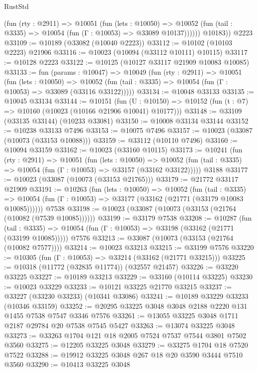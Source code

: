 \begin{lexlean}{RustStd}
\begin{coremodule}
            (fun (rty : @2911) =>
            @10051
              (fun (lets : @10050) =>
              @10052 (fun (tail : @3335) => @10054 (fun (Γ : @10053) => @33089 @10137))))))
        @10183))
    @2223
@33109 := @10189 (@33082 (@10040 @2223))
@33112 := @10102 (@10103 @2223) @21906
@33116 := @10023 (@10094 (@33112 @10111) @10115)
@33117 := @10128 @2223
@33122 := @10125 (@10127 @33117 @21909 @10083 @10085)
@33133 := fun (params : @10047) =>
  @10049
    (fun (rty : @2911) =>
    @10051
      (fun (lets : @10050) =>
      @10052 (fun (tail : @3335) => @10054 (fun (Γ : @10053) => @33089 (@33116 @33122)))))
@33134 := @10048 @33133
@33135 := @10045 @33134
@33144 := @10151
    (fun (U : @10150) => @10152 (fun (t : @7) => @10160 (@10023 (@10166 @21906 @10041) @10177)))
@33148 := @33109 (@33135 @33144) (@10233 @33081)
@33150 := @10008 @33134 @33144
@33152 := @10238 @33133 @7496
@33153 := @10075 @7496
@33157 := @10023 (@33087 (@10073 (@33153 @10088)))
@33159 := @33112 (@10110 @7496)
@33160 := @10094 @33159
@33162 := @10023 (@33160 @10115)
@33173 := @10241
    (fun (rty : @2911) =>
    @10051
      (fun (lets : @10050) =>
      @10052 (fun (tail : @3335) => @10054 (fun (Γ : @10053) => @33157 (@33162 @33122)))))
    @3188
@33177 := @10023 (@33087 (@10073 (@33153 @21765)))
@33179 := @21772 @33117 @21909
@33191 := @10263
    (fun (lets : @10050) =>
    @10052
      (fun (tail : @3335) =>
      @10054 (fun (Γ : @10053) => @33177 (@33162 (@21771 (@33179 @10083 @10085))))))
    @7538
@33198 := @10023 (@33087 (@10073 (@33153 (@21764 (@10082 (@7539 @10085))))))
@33199 := @33179 @7538
@33208 := @10287
    (fun (tail : @3335) => @10054 (fun (Γ : @10053) => @33198 (@33162 (@21771 (@33199 @10085)))))
    @7576
@33213 := @33087 (@10073 (@33153 (@21764 (@10082 @7577))))
@33214 := @10023 @33213
@33215 := @33199 @7576
@33220 := @10305 (fun (Γ : @10053) => @33214 (@33162 (@21771 @33215)))
@33225 := @10318 (@11772 (@32835 @11774)) (@32557 @21457)
@33226 := @33220 @33225
@33227 := @10189 @33213
@33229 := @33160 (@10114 @33225)
@33230 := @10023 @33229
@33233 := @10121 @33225 @21770 @33215
@33237 := @33227 (@33230 @33233) (@10341 @33086)
@33241 := @10189 @33229 @33233 (@10346 @33159)
@33252 := @20295 @33225 @3048 @3048 @2188 @2220 @131 @1455 @7538 @7547 @3346 @7576
@33261 := @13055 @33225 @3048 @1711 @2187 @29784 @20 @7538 @7545 @5427
@33263 := @13074 @33225 @3048
@33273 := @33263 @1704 @121 @18 @2005 @7524 @7537 @7544 @3801 @7502 @3560
@33275 := @12205 @33225 @3048
@33279 := @33275 @1704 @18 @7520 @7522
@33288 := @19912 @33225 @3048 @267 @18 @20 @3590 @3444 @7510 @3560
@33290 := @10413 @33225 @3048

\end{coremodule}
\end{lexlean}
